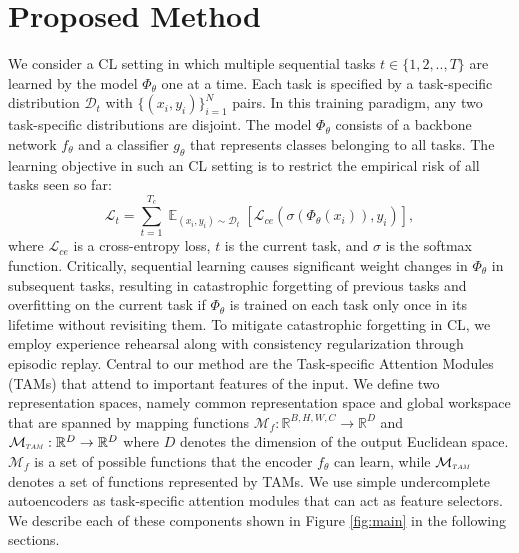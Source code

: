 \documentclass{article} %
\begin{document}
\section{Proposed Method}

We consider a CL setting in which multiple sequential tasks $t \in \{1, 2, .., T\}$ are learned by the model $\Phi_\theta$ one at a time. Each task is specified by a task-specific distribution $\mathcal{D}_t$ with $\{(x_i, y_i)\}_{i=1}^{N}$ pairs. In this training paradigm, any two task-specific distributions are disjoint. The model $\Phi_\theta$ consists of a backbone network $f_\theta$ and a classifier $g_\theta$ that represents classes belonging to all tasks. The learning objective in such an CL setting is to restrict the empirical risk of all tasks seen so far: 
\begin{equation}
    \mathcal{L}_{t} = \sum_{t=1}^{T_{c}} \displaystyle \mathop{\mathbb{E}}_{(x_{i}, y_{i}) \sim \mathcal{D}_{t}} \left[ \mathcal{L}_{ce} (\sigma (\Phi_{\theta}(x_{i})), y_{i}) \right],
\label{eqn_ce}
\end{equation}
where $\mathcal{L}_{ce}$ is a cross-entropy loss, $t$ is the current task, and $\sigma$ is the softmax function. Critically, sequential learning causes significant weight changes in $\Phi_\theta$ in subsequent tasks, resulting in catastrophic forgetting of previous tasks and overfitting on the current task if $\Phi_\theta$ is trained on each task only once in its lifetime without revisiting them. To mitigate catastrophic forgetting in CL, we employ experience rehearsal along with consistency regularization through episodic replay. Central to our method are the Task-specific Attention Modules (TAMs) that attend to important features of the input.   We define two representation spaces, namely common representation space and global workspace that are spanned by mapping functions $\mathcal{M}_f: \mathbb{R}^{B, H, W, C} \rightarrow \mathbb{R}^{D}$ and $\mathcal{M}_{\scaleto{TAM}{3pt}}: \mathbb{R}^{D} \rightarrow \mathbb{R}^{D}$ where $D$ denotes the dimension of the output Euclidean space. $\mathcal{M}_f$ is a set of possible functions that the encoder $f_\theta$ can learn, while $\mathcal{M}_{\scaleto{TAM}{3pt}}$ denotes a set of functions represented by TAMs. We use simple undercomplete autoencoders as task-specific attention modules that can act as feature selectors. We describe each of these components shown in Figure \ref{fig:main} in the following sections.
\end{document}
